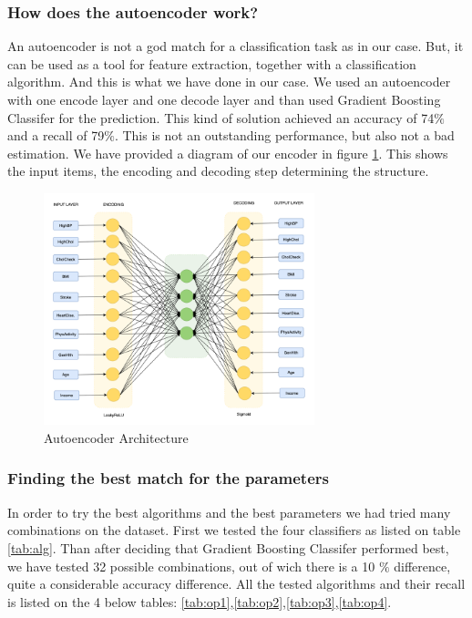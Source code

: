 \subsubsection{How does the autoencoder work?}
An autoencoder is not a god match for a classification task as in our case. But, it can be used as a tool for feature extraction, together with a classification algorithm. And this is what we have done in our case. We used an autoencoder with one encode layer and one decode layer and than used Gradient Boosting Classifer for the prediction. This kind of solution achieved an accuracy of 74$\%$ and a recall of 79$\%$. This is not an outstanding performance, but also not a bad estimation.
We have provided a diagram of our encoder in figure \ref{fig:autoencoder}. This shows the input items, the encoding and decoding step determining the structure.\\

\begin{figure}[h]
    \centering
    \includegraphics[width=0.7\textwidth]{images/autoencoder.png}
    \caption{Autoencoder Architecture}
    \label{fig:autoencoder}
\end{figure}

\subsubsection{Finding the best match for the parameters}
In order to try the best algorithms and the best parameters we had tried many combinations on the dataset.
First we tested the four classifiers as listed on table \ref{tab:alg}. Than after deciding that Gradient Boosting Classifer performed best, we have tested 32 possible combinations, out of wich there is a 10 $\%$ difference, quite a considerable accuracy difference.
All the tested algorithms and their recall is listed on the 4 below tables: \ref{tab:op1},\ref{tab:op2},\ref{tab:op3},\ref{tab:op4}.

